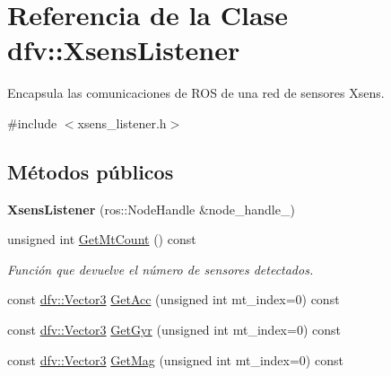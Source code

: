 \hypertarget{classdfv_1_1XsensListener}{\section{\-Referencia de la \-Clase dfv\-:\-:\-Xsens\-Listener}
\label{classdfv_1_1XsensListener}
}


\-Encapsula las comunicaciones de \-R\-O\-S de una red de sensores \-Xsens.  




{\ttfamily \#include $<$xsens\-\_\-listener.\-h$>$}

\subsection*{\-Métodos públicos}
\begin{DoxyCompactItemize}
\item 
\hypertarget{classdfv_1_1XsensListener_a545d4b10d2c34166d82bc41403e39a00}{{\bfseries \-Xsens\-Listener} (ros\-::\-Node\-Handle \&node\-\_\-handle\-\_\-)}\label{classdfv_1_1XsensListener_a545d4b10d2c34166d82bc41403e39a00}

\item 
\hypertarget{classdfv_1_1XsensListener_a5d31c2bd34dcbd18c60634e994c02ed3}{unsigned int \hyperlink{classdfv_1_1XsensListener_a5d31c2bd34dcbd18c60634e994c02ed3}{\-Get\-Mt\-Count} () const }\label{classdfv_1_1XsensListener_a5d31c2bd34dcbd18c60634e994c02ed3}

\begin{DoxyCompactList}\small\item\em \-Función que devuelve el número de sensores detectados. \end{DoxyCompactList}\item 
const \hyperlink{classdfv_1_1Vector3}{dfv\-::\-Vector3} \hyperlink{classdfv_1_1XsensListener_a940577a890abfe31a9f765766abbb0ec}{\-Get\-Acc} (unsigned int mt\-\_\-index=0) const 
\item 
const \hyperlink{classdfv_1_1Vector3}{dfv\-::\-Vector3} \hyperlink{classdfv_1_1XsensListener_a3896a0a58d557a5e9299415a146d80ed}{\-Get\-Gyr} (unsigned int mt\-\_\-index=0) const 
\item 
\hypertarget{classdfv_1_1XsensListener_a5eb779af51de20f10434711cb06ea153}{const \hyperlink{classdfv_1_1Vector3}{dfv\-::\-Vector3} \hyperlink{classdfv_1_1XsensListener_a5eb779af51de20f10434711cb06ea153}{\-Get\-Mag} (unsigned int mt\-\_\-index=0) const }\label{classdfv_1_1XsensListener_a5eb779af51de20f10434711cb06ea153}


\end{DoxyCompactItemize}
